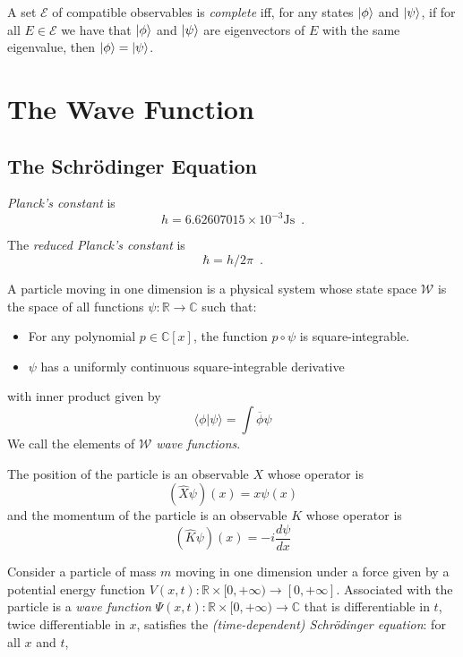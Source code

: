 \begin{df}[Complete]
A set $\mathcal{E}$ of compatible observables is \emph{complete} iff, for any states $\left| {\phi} \right\rangle$ and $\left| {\psi} \right\rangle$, if for all $E \in \mathcal{E}$ we have that $\left| {\phi} \right\rangle$ and $\left| {\psi} \right\rangle$ are eigenvectors of $E$ with the same eigenvalue, then $\left| {\phi} \right\rangle = \left| {\psi} \right\rangle$.
\end{df}

\chapter{The Wave Function}

\section{The Schr\"{o}dinger Equation}

\begin{df}
\emph{Planck's constant} is
\[ h = 6.62607015 \times 10^{-3} \mathrm{Js} \enspace . \]
\end{df}

\begin{df}
The \emph{reduced Planck's constant} is
\[ \hbar = h / 2 \pi \enspace . \]
\end{df}

\begin{ax}
A particle moving in one dimension is a physical system whose state space $\mathcal{W}$ is the space of all functions $\psi : \mathbb{R} \rightarrow \mathbb{C}$ such that:
\begin{itemize}
\item For any polynomial $p \in \mathbb{C}[x]$, the function $p \circ \psi$ is square-integrable.
\item $\psi$ has a uniformly continuous square-integrable derivative
\end{itemize}
with inner product given by
\[ \langle \phi | \psi \rangle = \int \overline{\phi} \psi \]
We call the elements of $\mathcal{W}$ \emph{wave functions}.

The position of the particle is an observable $X$ whose operator is
\[ (\hat{X} \psi)(x) = x \psi(x) \]
and the momentum of the particle is an observable $K$ whose operator is
\[ (\hat{K} \psi)(x) = - i \frac{d \psi}{dx} \]
\end{ax}

Consider a particle of mass $m$ moving in one dimension under a force given by a potential energy function $V(x,t) : \mathbb{R} \times [0,+\infty) \rightarrow [0, + \infty]$. Associated with the particle is a \emph{wave function} $\Psi(x,t) : \mathbb{R} \times [0,+\infty) \rightarrow \mathbb{C}$ that is differentiable in $t$, twice differentiable in $x$, satisfies the \emph{(time-dependent) Schr\"{o}dinger equation}: for all $x$ and $t$,

